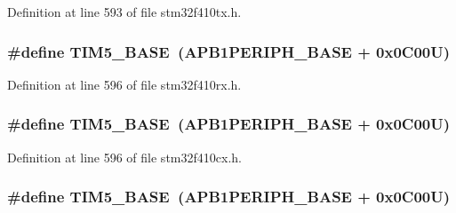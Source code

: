 Definition at line 593 of file stm32f410tx.\+h.

\subsubsection[{\texorpdfstring{T\+I\+M5\+\_\+\+B\+A\+SE}{TIM5_BASE}}]{\setlength{\rightskip}{0pt plus 5cm}\#define T\+I\+M5\+\_\+\+B\+A\+SE~({\bf A\+P\+B1\+P\+E\+R\+I\+P\+H\+\_\+\+B\+A\+SE} + 0x0\+C00\+U)}\hypertarget{group___peripheral__registers__structures_ga3e1671477190d065ba7c944558336d7e}{}\label{group___peripheral__registers__structures_ga3e1671477190d065ba7c944558336d7e}


Definition at line 596 of file stm32f410rx.\+h.

\subsubsection[{\texorpdfstring{T\+I\+M5\+\_\+\+B\+A\+SE}{TIM5_BASE}}]{\setlength{\rightskip}{0pt plus 5cm}\#define T\+I\+M5\+\_\+\+B\+A\+SE~({\bf A\+P\+B1\+P\+E\+R\+I\+P\+H\+\_\+\+B\+A\+SE} + 0x0\+C00\+U)}\hypertarget{group___peripheral__registers__structures_ga3e1671477190d065ba7c944558336d7e}{}\label{group___peripheral__registers__structures_ga3e1671477190d065ba7c944558336d7e}


Definition at line 596 of file stm32f410cx.\+h.

\subsubsection[{\texorpdfstring{T\+I\+M5\+\_\+\+B\+A\+SE}{TIM5_BASE}}]{\setlength{\rightskip}{0pt plus 5cm}\#define T\+I\+M5\+\_\+\+B\+A\+SE~({\bf A\+P\+B1\+P\+E\+R\+I\+P\+H\+\_\+\+B\+A\+SE} + 0x0\+C00\+U)}\hypertarget{group___peripheral__registers__structures_ga3e1671477190d065ba7c944558336d7e}{}\label{group___peripheral__registers__structures_ga3e1671477190d065ba7c944558336d7e}


